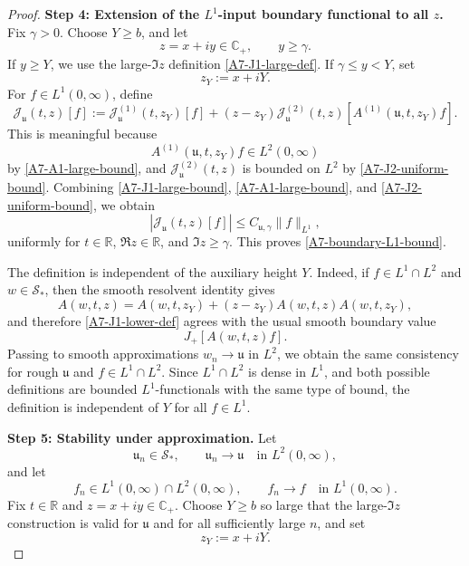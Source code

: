 \documentclass[10pt]{article}
\numberwithin{equation}{section}
\numberwithin{theorem}{section}
\begin{document}
\begin{appendix}
\begin{proof}
\medskip
\noindent
\textbf{Step 4: Extension of the \(L^1\)-input boundary functional to all \(z\).}
Fix \(\gamma>0\). Choose \(Y\ge b\), and let
\[
z=x+iy\in\mathbb C_+,
\qquad y\ge\gamma.
\]
If \(y\ge Y\), we use the large-\(\Im z\) definition
\eqref{A7-J1-large-def}. If \(\gamma\le y<Y\), set
\[
z_Y:=x+iY.
\]
For \(f\in L^1(0,\infty)\), define
\begin{equation}
\label{A7-J1-lower-def}
\mathcal J_{\mathfrak u}(t,z)[f]
:=
\mathcal J^{(1)}_{\mathfrak u}(t,z_Y)[f]
+
(z-z_Y)
\mathcal J^{(2)}_{\mathfrak u}(t,z)
\left[
A^{(1)}(\mathfrak u,t,z_Y)f
\right].
\end{equation}
This is meaningful because
\[
A^{(1)}(\mathfrak u,t,z_Y)f\in L^2(0,\infty)
\]
by \eqref{A7-A1-large-bound}, and
\(\mathcal J^{(2)}_{\mathfrak u}(t,z)\) is bounded on \(L^2\) by
\eqref{A7-J2-uniform-bound}. Combining \eqref{A7-J1-large-bound},
\eqref{A7-A1-large-bound}, and \eqref{A7-J2-uniform-bound}, we obtain
\[
|\mathcal J_{\mathfrak u}(t,z)[f]|
\le
C_{\mathfrak u,\gamma}\|f\|_{L^1},
\]
uniformly for \(t\in\mathbb R\), \(\Re z\in\mathbb R\), and \(\Im z\ge\gamma\).
This proves \eqref{A7-boundary-L1-bound}.

The definition is independent of the auxiliary height \(Y\). Indeed, if
\(f\in L^1\cap L^2\) and \(w\in\mathcal S_*\), then the smooth resolvent identity
gives
\[
A(w,t,z)
=
A(w,t,z_Y)
+
(z-z_Y)A(w,t,z)A(w,t,z_Y),
\]
and therefore \eqref{A7-J1-lower-def} agrees with the usual smooth boundary
value
\[
J_+[A(w,t,z)f].
\]
Passing to smooth approximations \(w_n\to\mathfrak u\) in \(L^2\), we obtain the
same consistency for rough \(\mathfrak u\) and \(f\in L^1\cap L^2\). Since
\(L^1\cap L^2\) is dense in \(L^1\), and both possible definitions are bounded
\(L^1\)-functionals with the same type of bound, the definition is independent
of \(Y\) for all \(f\in L^1\).

\medskip
\noindent
\textbf{Step 5: Stability under approximation.}
Let
\[
\mathfrak u_n\in\mathcal S_*,
\qquad
\mathfrak u_n\to\mathfrak u
\quad\text{in }L^2(0,\infty),
\]
and let
\[
f_n\in L^1(0,\infty)\cap L^2(0,\infty),
\qquad
f_n\to f
\quad\text{in }L^1(0,\infty).
\]
Fix \(t\in\mathbb R\) and \(z=x+iy\in\mathbb C_+\). Choose \(Y\ge b\) so large
that the large-\(\Im z\) construction is valid for \(\mathfrak u\) and for all
sufficiently large \(n\), and set
\[
z_Y:=x+iY.
\]


\end{proof}
\end{appendix}
\end{document}
